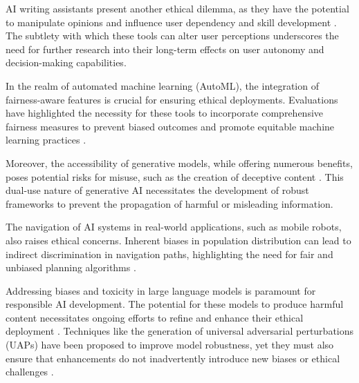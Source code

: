 AI writing assistants present another ethical dilemma, as they have the potential to manipulate opinions and influence user dependency and skill development \cite{benharrak2024deceptivepatternsintelligentinteractive}. The subtlety with which these tools can alter user perceptions underscores the need for further research into their long-term effects on user autonomy and decision-making capabilities.



In the realm of automated machine learning (AutoML), the integration of fairness-aware features is crucial for ensuring ethical deployments. Evaluations have highlighted the necessity for these tools to incorporate comprehensive fairness measures to prevent biased outcomes and promote equitable machine learning practices \cite{narayanan2023democratizecareneedfairness}.



Moreover, the accessibility of generative models, while offering numerous benefits, poses potential risks for misuse, such as the creation of deceptive content \cite{dhariwal2021diffusion}. This dual-use nature of generative AI necessitates the development of robust frameworks to prevent the propagation of harmful or misleading information.



The navigation of AI systems in real-world applications, such as mobile robots, also raises ethical concerns. Inherent biases in population distribution can lead to indirect discrimination in navigation paths, highlighting the need for fair and unbiased planning algorithms \cite{brandao2020fairnavigationplanninghumanitarian}.



Addressing biases and toxicity in large language models is paramount for responsible AI development. The potential for these models to produce harmful content necessitates ongoing efforts to refine and enhance their ethical deployment \cite{chowdhery2023palm}. Techniques like the generation of universal adversarial perturbations (UAPs) have been proposed to improve model robustness, yet they must also ensure that enhancements do not inadvertently introduce new biases or ethical challenges \cite{zhang2024universaladversarialperturbationsvisionlanguage}.














